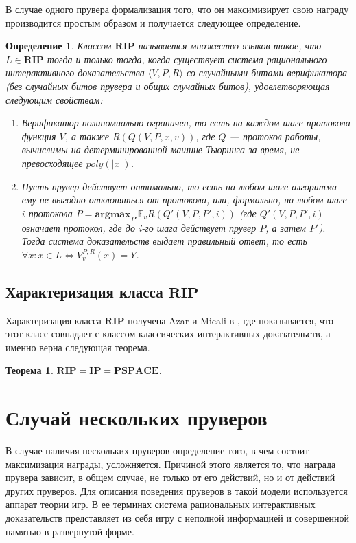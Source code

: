 \documentclass[14pt, a4paper]{extreport}
\newtheorem{theorem}{\indent Теорема}
\newtheorem{definition}{\indent Определение}
\newcommand{\poly}{\textit{poly}}
\begin{document}
В случае одного прувера формализация того, что он максимизирует свою награду производится простым образом и получается следующее определение.
\begin{definition}\label{rip}
    Классом $\textbf{RIP}$ называется множество языков такое, что $L \in \textbf{RIP}$ тогда и только тогда, когда существует система рационального интерактивного доказательства $\langle V, P, R\rangle$ со случайными битами верификатора (без случайных битов прувера и общих случайных битов), удовлетворяющая следующим свойствам:
    \begin{enumerate}
        \item Верификатор полиномиально ограничен, то есть на каждом шаге протокола функция $V$, а также $R(Q(V, P, x, v))$, где $Q$ --- протокол работы, вычислимы на детерминированной машине Тьюринга за время, не превосходящее $\poly(|x|)$.
        \item Пусть прувер действует оптимально, то есть на любом шаге алгоритма ему не выгодно отклоняться от протокола, или, формально, на любом шаге $i$ протокола $P = \textbf{argmax}_{P'} \mathbb{E}_v R(Q'(V, P, P', i))$ (где $Q'(V, P, P', i)$ означает протокол, где до i-го шага действует прувер $P$, а затем $P'$). Тогда система доказательств выдает правильный ответ, то есть $\forall x: x \in L \iff V^{P, R}_{v}(x) = Y$.
        \end{enumerate}
    \end{definition}

    \section{Характеризация класса $\textbf{RIP}$}
    Характеризация класса $\textbf{RIP}$ получена Azar и Micali в \cite{azar2012rational}, где показывается, что этот класс совпадает с классом классических интерактивных доказательств, а именно верна следующая теорема.
    \begin{theorem}
        $\textbf{RIP} = \textbf{IP} = \textbf{PSPACE}$.
    \end{theorem}
        \chapter{Случай нескольких пруверов}
        В случае наличия нескольких пруверов определение того, в чем состоит максимизация награды, усложняется. Причиной этого является то, что награда прувера зависит, в общем случае, не только от его действий, но и от действий других пруверов. Для описания поведения пруверов в такой модели используется аппарат теории игр. В ее терминах система рациональных интерактивных доказательств представляет из себя игру с неполной информацией и совершенной памятью в развернутой форме.
\end{document}
